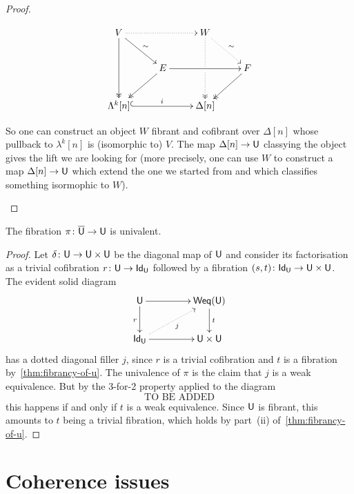 \documentclass[reqno,10pt,a4paper,oneside,draft]{amsart}
\begin{document}
\begin{proof}
\begin{enumerate}[(i)]
\[ 
\xymatrix{
  V
  \ar@{.>}[rr]
  \ar[dr]^{\sim}
  \ar@{->>}[dd]
&&
  W
  \ar@{.>}[dr]^{\sim}
  \ar@{.>>}[dd]|{\hole}
&\\&
  E
  \ar[rr]
  \ar@{->>}[dl]
&&
  F
  \ar@{->>}[dl]
\\
  \Lambda^k[n]
  \ar@{^{(}->}[rr]^i
&&
  \Delta[n]
&
}
\] 


So one can construct an object $W$ fibrant and cofibrant over $\Delta[n]$ whose pullback to $\lambda^k[n]$ is (isomorphic to) $V$. The map $\Delta[n] \rightarrow \mathsf{U}$ classying the object gives the lift we are looking for (more precisely, one can use $W$ to construct  a map $\Delta[n] \rightarrow \mathsf{U}$ which extend the one we started from and which classifies something isormophic to $W$). \qedhere
\end{enumerate}
\end{proof}



\begin{corollary} The fibration $\pi \colon \overline{\mathsf{U}} \to \mathsf{U}$ is univalent.
\end{corollary}

\begin{proof} Let $\delta \colon \mathsf{U} \to \mathsf{U} \times \mathsf{U}$ be the diagonal map of $\mathsf{U}$ and consider its factorisation
as a trivial cofibration $r \colon \mathsf{U} \to \mathsf{Id}_{\mathsf{U}}$ followed by a fibration $(s,t) \colon \mathsf{Id}_{\mathsf{U}} \to \mathsf{U} \times \mathsf{U}$. The evident solid diagram
\[
\xymatrix@C=1.5cm{
\U \ar[r] \ar[d]_r & \Weq(\U) \ar[d]^{t} \\
\mathsf{Id}_\U \ar[r]  \ar@{.>}[ur]_{j} &  \U \times \U }
\]
has a dotted diagonal filler $j$, since $r$ is a trivial cofibration and $t$ is a fibration by~\cref{thm:fibrancy-of-u}. The univalence of $\pi$ is the claim that $j$ is a weak equivalence. But by the 3-for-2 property applied to the diagram
\[
\text{TO BE ADDED}
\]
this happens if and only if $t$ is a weak equivalence. Since $\mathsf{U}$ is fibrant, this amounts to $t$ being a trivial
fibration, which holds by part~(ii) of~\cref{thm:fibrancy-of-u}. 
\end{proof} 


\bigskip




 

\section{Coherence issues}
\label{sec:conout}
\label{sec:conclusions}
\end{document}

